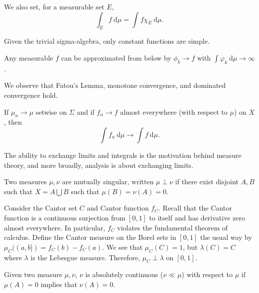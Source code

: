 \documentclass[10pt, twoside]{article}
\renewcommand{\d}{\ \mathrm{d}}
\begin{document}
    We also set, for a measurable set $E$, \[\int_{E} f\ \mathrm{d}\mu = \int f\chi_{E}\ \mathrm{d}\mu. \]

    \begin{exm}
        Given the trivial sigma-algebra, only constant functions are simple.
    \end{exm}

    \begin{lem}
        Any measurable $f$ can be approximated from below by $\phi_k \rightarrow f$ with $\int \varphi_k\ \mathrm{d}\mu \rightarrow \infty$.
    \end{lem}

    We observe that Fatou's Lemma, monotone convergence, and dominated convergence hold.

    \begin{lem}
        If $\mu_n \rightarrow \mu$ setwise on $\Sigma$ and if $f_n \rightarrow f$ almost everywhere (with respect to $\mu$) on $X$, then \[\int f_n \d \mu \rightarrow \int f \d \mu.\]
    \end{lem}

    The ability to exchange limits and integrals is the motivation behind measure theory, and more broadly, analysis is about exchanging limits.

    \begin{defn}
        Two measures $\mu, \nu$ are mutually singular, written $\mu \perp \nu$ if there exist disjoint $A,B$ such that $X = A \bigcup B$ such that $\mu(B) = \nu(A) = 0$.
    \end{defn}

    \begin{exm}[Cantor]
        Consider the Cantor set $C$ and Cantor function $f_C$. Recall that the Cantor function is a continuous surjection from $[0,1]$ to itself and has derivative zero almost everywhere. In particular, $f_C$ violates the fundamental theorem of calculus. Define the Cantor measure on the Borel sets in $[0,1]$ the usual way by $\mu_C((a,b]) = f_C(b) - f_C(a)$. We see that $\mu_C(C) = 1$, but $\lambda(C) = C$ where $\lambda$ is the Lebesgue measure. Therefore, $\mu_C \perp \lambda$ on $[0,1]$.
    \end{exm}

    \begin{defn}
        Given two measure $\mu, \nu$, $\nu$ is absolutely continuous ($\nu \ll \mu$) with respect to $\mu$ if $\mu(A) = 0$ implies that $\nu(A) = 0$.
    \end{defn}
\end{document}
